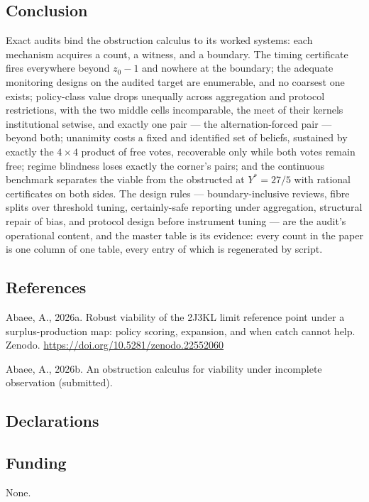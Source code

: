 \documentclass[10pt,twocolumn]{article}
\theoremstyle{definition}
\begin{document}
\subsection{Conclusion}\label{conclusion}

Exact audits bind the obstruction calculus to its worked systems: each
mechanism acquires a count, a witness, and a boundary. The timing
certificate fires everywhere beyond \(z_0 - 1\) and nowhere at the
boundary; the adequate monitoring designs on the audited target are
enumerable, and no coarsest one exists; policy-class value drops
unequally across aggregation and protocol restrictions, with the two
middle cells incomparable, the meet of their kernels institutional
setwise, and exactly one pair --- the alternation-forced pair --- beyond
both; unanimity costs a fixed and identified set of beliefs, sustained
by exactly the \(4 \times 4\) product of free votes, recoverable only
while both votes remain free; regime blindness loses exactly the
corner's pairs; and the continuous benchmark separates the viable from
the obstructed at \(Y^{*} = 27/5\) with rational certificates on both
sides. The design rules --- boundary-inclusive reviews, fibre splits
over threshold tuning, certainly-safe reporting under aggregation,
structural repair of bias, and protocol design before instrument tuning
--- are the audit's operational content, and the master table is its
evidence: every count in the paper is one column of one table, every
entry of which is regenerated by script.

\subsection*{References}

Abaee, A., 2026a. Robust viability of the 2J3KL limit reference point
under a surplus-production map: policy scoring, expansion, and when
catch cannot help. Zenodo.
\url{https://doi.org/10.5281/zenodo.22552060}

Abaee, A., 2026b. An obstruction calculus for viability under
incomplete observation (submitted).

\subsection*{Declarations}

\subsection*{Funding}
None.
\end{document}
